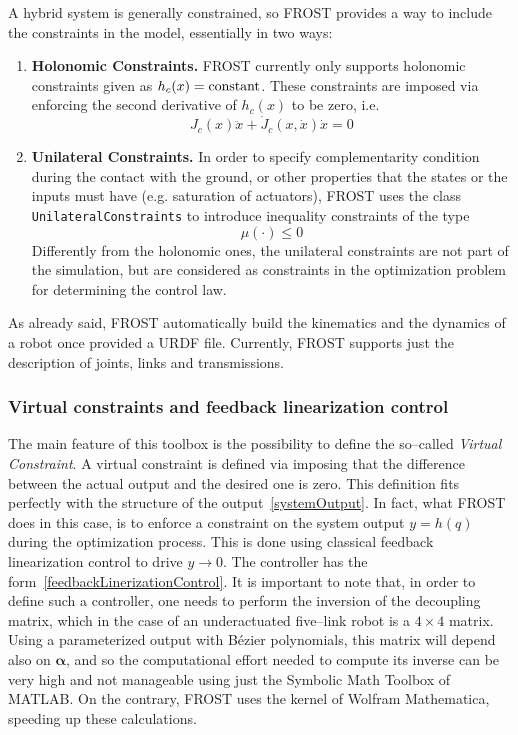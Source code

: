 \documentclass[11pt]{article}
\begin{document}
A hybrid system is generally constrained, so FROST provides a way to include the constraints in the model, essentially in two ways:
\begin{enumerate}
    \item \textbf{Holonomic Constraints.} FROST currently only supports holonomic constraints given as $h_c(x) = \textup{constant}$. These constraints are imposed via enforcing the second derivative of $h_c(x)$ to be zero, i.e.
    \[
    J_c(x)\ddot{x} + \dot{J}_c(x,\dot{x})\dot{x} = 0
    \]
    \item \textbf{Unilateral Constraints.} In order to specify complementarity condition during the contact with the ground, or other properties that the states or the inputs must have (e.g. saturation of actuators), FROST uses the class \verb!UnilateralConstraints! to introduce inequality constraints of the type 
    \[
    \mu(\cdot) \leq 0
    \]
    Differently from the holonomic ones, the unilateral constraints are not part of the simulation, but are considered as constraints in the optimization problem for determining the control law.
\end{enumerate}

As already said, FROST automatically build the kinematics and the dynamics of a robot once provided a URDF file. Currently, FROST supports just the description of joints, links and transmissions.

\subsubsection{Virtual constraints and feedback linearization control}

The main feature of this toolbox is the possibility to define the so--called \textit{Virtual Constraint}. A virtual constraint is defined via imposing that the difference between the actual output and the desired one is zero. This definition fits perfectly with the structure of the output~\eqref{systemOutput}. In fact, what FROST does in this case, is to enforce a constraint on the system output $y = h(q)$ during the optimization process. This is done using classical feedback linearization control to drive $y \rightarrow 0$. The controller has the form~\eqref{feedbackLinerizationControl}. It is important to note that, in order to define such a controller, one needs to perform the inversion of the decoupling matrix, which in the case of an underactuated five--link robot is a $4 \times 4$ matrix. Using a parameterized output with Bézier polynomials, this matrix will depend also on $\bm{\alpha}$, and so the computational effort needed to compute its inverse can be very high and not manageable using just the Symbolic Math Toolbox of MATLAB. On the contrary, FROST uses the kernel of Wolfram Mathematica, speeding up these calculations.
\end{document}
